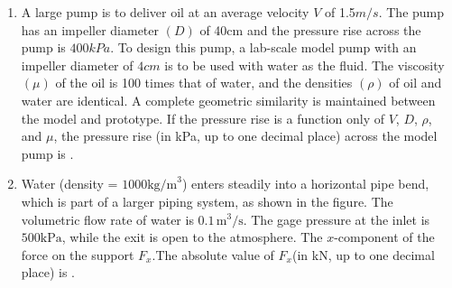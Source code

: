 \documentclass[journal,12pt,onecolumn]{IEEEtran}
\theoremstyle{remark}
\begin{document}
\begin{enumerate}
    \item A large pump is to deliver oil at an average velocity $V$ of  1.5$m/s$. The pump has an impeller diameter $(D)$ of 40cm and the pressure rise across the pump is $400{kPa}$. To design this pump, a lab-scale model pump with an impeller diameter of $4{cm}$ is to be used with water as the fluid. The viscosity $(\mu)$ of the oil is 100 times that of water, and the densities $(\rho)$ of oil and water are identical. A complete geometric similarity is maintained between the model and prototype. If the pressure rise is a function only of $V$, $D$, $\rho$, and $\mu$, the pressure rise (in kPa, up to one decimal place) across the model pump is {\underline{\hspace{2cm}}}.

    \item Water (density = $1000  \text{kg/m}^3$) enters steadily into a horizontal pipe bend, which is part of a larger piping system, as shown in the figure. The volumetric flow rate of water is $0.1 \, \text{m}^3/\text{s}$. The gage pressure at the inlet is $500\text{kPa}$, while the exit is open to the atmosphere. The $x$-component of the force on the support $F_x$.The absolute value of $F_x$(in kN, up to one decimal place) is {\underline{\hspace{2cm}}}.
    \begin{figure}[H]
        \centering
          
    \end{figure}

\end{enumerate}
\end{document}
